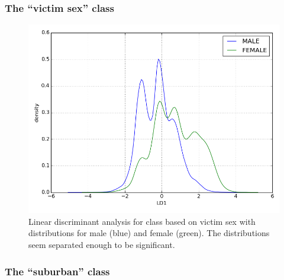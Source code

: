 \begin{multicols}{2}
\subsubsection{The ``victim sex'' class}

\begin{figure}[H]
  \centering
    \includegraphics[width=\linewidth]{images/vict_sex/vict_sex.png}
  \caption{Linear discriminant analysis for class based on victim sex with distributions for male (blue) and female (green).  The distributions seem separated enough to be significant.}
\end{figure}

\subsubsection{The ``suburban'' class}


\end{multicols}
